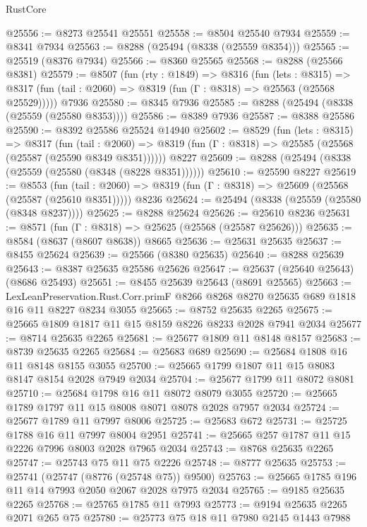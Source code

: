 \begin{lexlean}{RustCore}
\begin{coremodule}
@25556 := @8273 @25541 @25551
@25558 := @8504 @25540 @7934
@25559 := @8341 @7934
@25563 := @8288 (@25494 (@8338 (@25559 @8354)))
@25565 := @25519 (@8376 @7934)
@25566 := @8360 @25565
@25568 := @8288 (@25566 @8381)
@25579 := @8507
    (fun (rty : @1849) =>
    @8316
      (fun (lets : @8315) =>
      @8317 (fun (tail : @2060) => @8319 (fun (Γ : @8318) => @25563 (@25568 @25529)))))
    @7936
@25580 := @8345 @7936
@25585 := @8288 (@25494 (@8338 (@25559 (@25580 @8353))))
@25586 := @8389 @7936
@25587 := @8388 @25586
@25590 := @8392 @25586 @25524 @14940
@25602 := @8529
    (fun (lets : @8315) =>
    @8317
      (fun (tail : @2060) =>
      @8319 (fun (Γ : @8318) => @25585 (@25568 (@25587 (@25590 @8349 @8351))))))
    @8227
@25609 := @8288 (@25494 (@8338 (@25559 (@25580 (@8348 (@8228 @8351))))))
@25610 := @25590 @8227
@25619 := @8553
    (fun (tail : @2060) => @8319 (fun (Γ : @8318) => @25609 (@25568 (@25587 (@25610 @8351)))))
    @8236
@25624 := @25494 (@8338 (@25559 (@25580 (@8348 @8237))))
@25625 := @8288 @25624
@25626 := @25610 @8236
@25631 := @8571 (fun (Γ : @8318) => @25625 (@25568 (@25587 @25626)))
@25635 := @8584 (@8637 (@8607 @8638)) @8665
@25636 := @25631 @25635
@25637 := @8455 @25624
@25639 := @25566 (@8380 @25635)
@25640 := @8288 @25639
@25643 := @8387 @25635 @25586 @25626
@25647 := @25637 (@25640 @25643) (@8686 @25493)
@25651 := @8455 @25639 @25643 (@8691 @25565)
@25663 := LexLeanPreservation.Rust.Corr.primF
    @8266
    @8268
    @8270
    @25635
    @689
    @1818
    @16
    @11
    @8227
    @8234
    @3055
@25665 := @8752 @25635 @2265
@25675 := @25665 @1809 @1817 @11 @15 @8159 @8226 @8233 @2028 @7941 @2034
@25677 := @8714 @25635 @2265
@25681 := @25677 @1809 @11 @8148 @8157
@25683 := @8739 @25635 @2265
@25684 := @25683 @689
@25690 := @25684 @1808 @16 @11 @8148 @8155 @3055
@25700 := @25665 @1799 @1807 @11 @15 @8083 @8147 @8154 @2028 @7949 @2034
@25704 := @25677 @1799 @11 @8072 @8081
@25710 := @25684 @1798 @16 @11 @8072 @8079 @3055
@25720 := @25665 @1789 @1797 @11 @15 @8008 @8071 @8078 @2028 @7957 @2034
@25724 := @25677 @1789 @11 @7997 @8006
@25725 := @25683 @672
@25731 := @25725 @1788 @16 @11 @7997 @8004 @2951
@25741 := @25665 @257 @1787 @11 @15 @2226 @7996 @8003 @2028 @7965 @2034
@25743 := @8768 @25635 @2265
@25747 := @25743 @75 @11 @75 @2226
@25748 := @8777 @25635
@25753 := @25741 (@25747 (@8776 (@25748 @75)) @9500)
@25763 := @25665 @1785 @196 @11 @14 @7993 @2050 @2067 @2028 @7975 @2034
@25765 := @9185 @25635 @2265
@25768 := @25765 @1785 @11 @7993
@25773 := @9194 @25635 @2265 @2071 @265 @75
@25780 := @25773 @75 @18 @11 @7980 @2145 @1443 @7988

\end{coremodule}
\end{lexlean}
